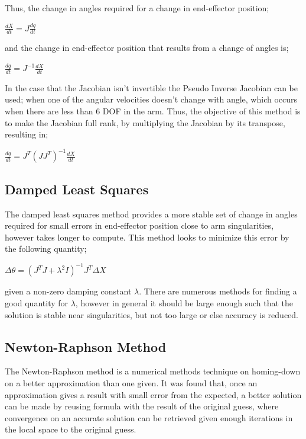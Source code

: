 \documentclass[12pt,openany,a4paper]{book}
\begin{document}
Thus, the change in angles required for a change in end-effector position;

$\frac{dX}{dt} = J \frac{dq}{dt}$

and the change in end-effector position that results from a change of angles is;

$\frac{dq}{dt} = J^{-1} \frac{dX}{dt}$

In the case that the Jacobian isn't invertible the Pseudo Inverse Jacobian can be used; when one of the angular velocities doesn't change with angle, which occurs when there are less than 6 DOF in the arm. Thus, the objective of this method is to make the Jacobian full rank, by multiplying the Jacobian by its transpose, resulting in;

$\frac{dq}{dt} = J^T (J J^T)^{-1} \frac{dX}{dt} $

\subsection{Damped Least Squares}
The damped least squares method provides a more stable set of change in angles required for small errors in end-effector position close to arm singularities, however takes longer to compute. This method looks to minimize this error by the following quantity;

$\Delta \theta = (J^T J + \lambda^2 I)^{-1} J^T \Delta X$

given a non-zero damping constant $\lambda$. There are numerous methods for finding a good quantity for $\lambda$, however in general it should be large enough such that the solution is stable near singularities, but not too large or else accuracy is reduced.

\subsection{Newton-Raphson Method}
The Newton-Raphson method is a numerical methods technique on homing-down on a better approximation than one given. It was found that, once an approximation gives a result with small error from the expected, a better solution can be made by reusing formula with the result of the original guess, where convergence on an accurate solution can be retrieved given enough iterations in the local space to the original guess.
\end{document}
